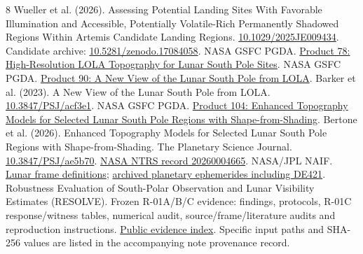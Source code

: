 \documentclass[conference,letterpaper]{IEEEtran}
\begin{document}
\begin{thebibliography}{8}
 Wueller et al. (2026). Assessing Potential Landing Sites With Favorable Illumination and Accessible, Potentially Volatile-Rich Permanently Shadowed Regions Within Artemis Candidate Landing Regions. \href{https://doi.org/10.1029/2025JE009434}{10.1029/2025JE009434}. Candidate archive: \href{https://doi.org/10.5281/zenodo.17084058}{10.5281/zenodo.17084058}.
 NASA GSFC PGDA. \href{https://pgda.gsfc.nasa.gov/products/78}{Product 78: High-Resolution LOLA Topography for Lunar South Pole Sites}.
 NASA GSFC PGDA. \href{https://pgda.gsfc.nasa.gov/products/90}{Product 90: A New View of the Lunar South Pole from LOLA}.
 Barker et al. (2023). A New View of the Lunar South Pole from LOLA. \href{https://doi.org/10.3847/PSJ/acf3e1}{10.3847/PSJ/acf3e1}.
 NASA GSFC PGDA. \href{https://pgda.gsfc.nasa.gov/products/104}{Product 104: Enhanced Topography Models for Selected Lunar South Pole Regions with Shape-from-Shading}.
 Bertone et al. (2026). Enhanced Topography Models for Selected Lunar South Pole Regions with Shape-from-Shading. The Planetary Science Journal. \href{https://doi.org/10.3847/PSJ/ae5b70}{10.3847/PSJ/ae5b70}. \href{https://ntrs.nasa.gov/citations/20260004665}{NASA NTRS record 20260004665}.
 NASA/JPL NAIF. \href{https://naif.jpl.nasa.gov/pub/naif/generic_kernels/fk/satellites/moon_080317.tf}{Lunar frame definitions}; \href{https://naif.jpl.nasa.gov/pub/naif/generic_kernels/spk/planets/a_old_versions/}{archived planetary ephemerides including DE421}.
 Robustness Evaluation of South-Polar Observation and Lunar Visibility Estimates (RESOLVE). Frozen R-01A/B/C evidence: findings, protocols, R-01C response/witness tables, numerical audit, source/frame/literature audits and reproduction instructions. \href{https://resolve-lunar-audit.vercel.app/science/}{Public evidence index}. Specific input paths and SHA-256 values are listed in the accompanying note provenance record.
\end{thebibliography}
\end{document}
